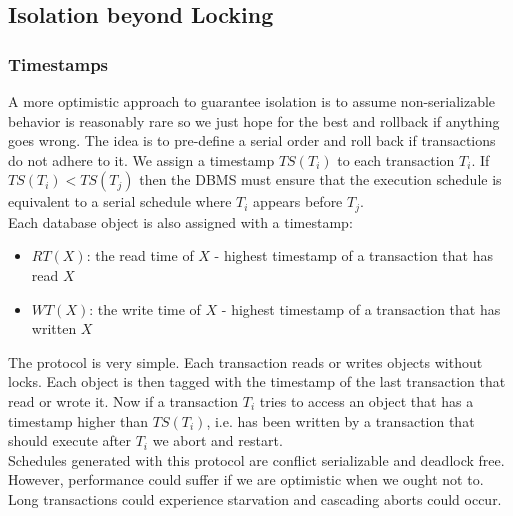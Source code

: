 \subsection{Isolation beyond Locking}
\subsubsection{Timestamps}
A more optimistic approach to guarantee isolation is to assume non-serializable behavior is reasonably rare so we just hope for the best and rollback if anything goes wrong. The idea is to pre-define a serial order and roll back if transactions do not adhere to it. We assign a timestamp $TS(T_i)$ to each transaction $T_i$. If $TS(T_i) < TS(T_j)$ then the DBMS must ensure that the execution schedule is equivalent to a serial schedule where $T_i$ appears before $T_j$.\\
Each database object is also assigned with a timestamp:
\begin{itemize}
\item $RT(X)$: the read time of $X$ - highest timestamp of a transaction that has read $X$
\item $WT(X)$: the write time of $X$ - highest timestamp of a transaction that has written $X$
\end{itemize}
The protocol is very simple. Each transaction reads or writes objects without locks. Each object is then tagged with the timestamp of the last transaction that read or wrote it. Now if a transaction $T_i$ tries to access an object that has a timestamp higher than $TS(T_i)$, i.e. has been written by a transaction that should execute after $T_i$ we abort and restart.\vspace{.2cm}\\
Schedules generated with this protocol are conflict serializable and deadlock free. However, performance could suffer if we are optimistic when we ought not to. Long transactions could experience starvation and cascading aborts could occur.

